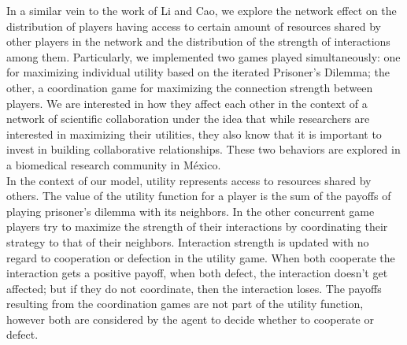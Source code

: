 \documentclass{bmcart}
\begin{document}

In a similar vein to the work of Li and Cao, we explore the network
effect on the distribution of players having access to certain amount
of resources shared by other players in the network and the
distribution of the strength of interactions among them. Particularly,
we implemented two games played simultaneously: one for maximizing
individual utility based on the iterated Prisoner's Dilemma; the
other, a coordination game for maximizing the connection strength
between players. We are interested in how they affect each other in
the context of a network of scientific collaboration under the idea
that while researchers are interested in maximizing their utilities,
they also know that it is important to invest in building
collaborative relationships. These two behaviors are explored in a
biomedical research community in M\'exico.\\

In the context of our model, utility represents access to resources
shared by others. The value of the utility function for a player is
the sum of the payoffs of playing prisoner's dilemma with its
neighbors. In the other concurrent game players try to maximize the
strength of their interactions by coordinating their strategy to that
of their neighbors. Interaction strength is updated with no regard to
cooperation or defection in the utility game. When both cooperate the
interaction gets a positive payoff, when both defect, the interaction
doesn't get affected; but if they do not coordinate, then the
interaction loses. The payoffs resulting from the coordination games
are not part of the utility function, however both are considered by
the agent to decide whether to cooperate or defect. \\
\end{document}

